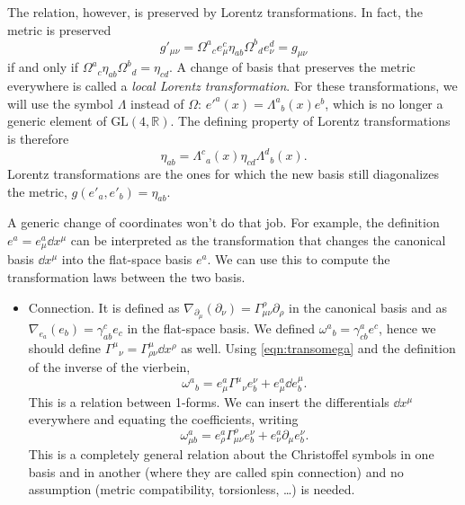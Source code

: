 \documentclass[a4paper,12pt]{book}
\begin{document}
The relation, however, is preserved by Lorentz transformations. In fact, the metric is preserved 
\[g'_{\mu\nu}=\Omega^a{}_ce^c_\mu\eta_{ab}\Omega^b{}_de^d_\nu=g_{\mu\nu}\]
if and only if $\Omega^a{}_c\eta_{ab}\Omega^b{}_d=\eta_{cd}$.
A change of basis that preserves the metric everywhere is called a \emph{local Lorentz transformation}. For these transformations, we will use the symbol $\Lambda$ instead of $\Omega$: $e'^a(x)=\Lambda^a{}_b(x)e^b$, which is no longer a generic element of $\text{GL}(4,\mathbb{R})$. The defining property of Lorentz transformations is therefore
\[\eta_{ab}=\Lambda^c{}_a(x)\eta_{cd}\Lambda^d{}_b(x).\]
Lorentz transformations are the ones for which the new basis still diagonalizes the metric, $g(e'_a,e'_b)=\eta_{ab}$.

A generic change of coordinates won't do that job. For example, the definition $e^a=e^a_\mu\dd x^\mu$ can be interpreted as the transformation that changes the canonical basis $\dd x^\mu$ into the flat-space basis $e^a$. We can use this to compute the transformation laws between the two basis.
\begin{itemize}
\item Connection. It is defined as $\nabla_{\partial_\mu}(\partial_\nu)=\Gamma_{\mu\nu}^\rho\partial_\rho$ in the canonical basis and as $\nabla_{e_a}(e_b)=\gamma_{ab}^ce_c$ in the flat-space basis. We defined $\omega^a{}_b=\gamma^a_{cb}e^c$, hence we should define $\Gamma^\mu{}_\nu=\Gamma^\mu_{\rho\nu}\dd x^\rho$ as well. Using \cref{eqn:transomega} and the definition of the inverse of the vierbein,
\[\omega^a{}_b=e^a_\mu\Gamma^\mu{}_\nu e^\nu_b+e^a_\mu\dd e^\mu_b.\]
This is a relation between 1-forms. We can insert the differentials $\dd x^\mu$ everywhere and equating the coefficients, writing
\[\omega_{\mu b}^a=e^a_\rho\Gamma^\rho_{\mu\nu}e^\nu_b+e^a_\nu\partial_\mu e^\nu_b.\]
This is a completely general relation about the Christoffel symbols in one basis and in another (where they are called spin connection) and no assumption (metric compatibility, torsionless, \ldots) is needed.

\end{itemize}
\end{document}
